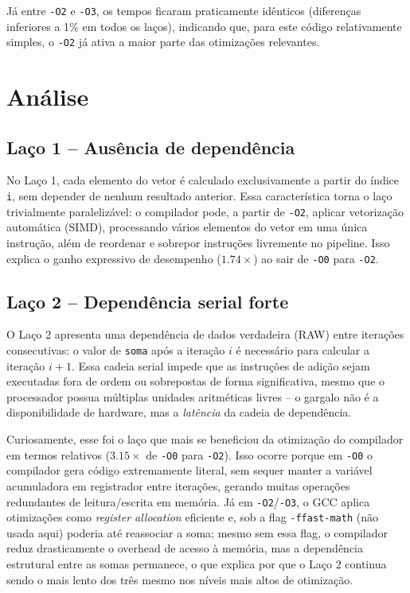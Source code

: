 \documentclass[a4paper,12pt]{article}
\begin{document}
Já entre \texttt{-O2} e \texttt{-O3}, os tempos ficaram praticamente idênticos (diferenças inferiores a 1\% em todos os laços), indicando que, para este código relativamente simples, o \texttt{-O2} já ativa a maior parte das otimizações relevantes.

\section{Análise}

\subsection{Laço 1 -- Ausência de dependência}

No Laço 1, cada elemento do vetor é calculado exclusivamente a partir do índice \texttt{i}, sem depender de nenhum resultado anterior. Essa característica torna o laço trivialmente paralelizável: o compilador pode, a partir de \texttt{-O2}, aplicar vetorização automática (SIMD), processando vários elementos do vetor em uma única instrução, além de reordenar e sobrepor instruções livremente no pipeline. Isso explica o ganho expressivo de desempenho ($1.74\times$) ao sair de \texttt{-O0} para \texttt{-O2}.

\subsection{Laço 2 -- Dependência serial forte}

O Laço 2 apresenta uma dependência de dados verdadeira (RAW) entre iterações consecutivas: o valor de \texttt{soma} após a iteração $i$ é necessário para calcular a iteração $i+1$. Essa cadeia serial impede que as instruções de adição sejam executadas fora de ordem ou sobrepostas de forma significativa, mesmo que o processador possua múltiplas unidades aritméticas livres -- o gargalo não é a disponibilidade de hardware, mas a \emph{latência} da cadeia de dependência.

Curiosamente, esse foi o laço que mais se beneficiou da otimização do compilador em termos relativos ($3.15\times$ de \texttt{-O0} para \texttt{-O2}). Isso ocorre porque em \texttt{-O0} o compilador gera código extremamente literal, sem sequer manter a variável acumuladora em registrador entre iterações, gerando muitas operações redundantes de leitura/escrita em memória. Já em \texttt{-O2}/\texttt{-O3}, o GCC aplica otimizações como \textit{register allocation} eficiente e, sob a flag \texttt{-ffast-math} (não usada aqui) poderia até reassociar a soma; mesmo sem essa flag, o compilador reduz drasticamente o overhead de acesso à memória, mas a dependência estrutural entre as somas permanece, o que explica por que o Laço 2 continua sendo o mais lento dos três mesmo nos níveis mais altos de otimização.
\end{document}
